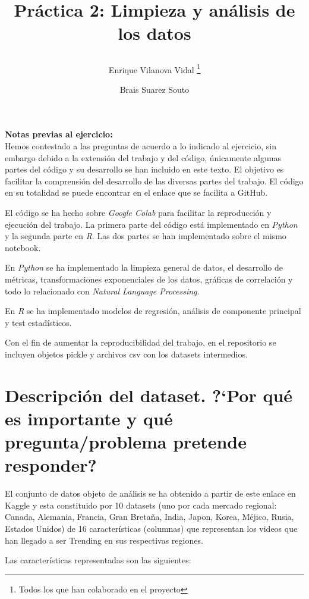 \documentclass[a4paper,12pt]{article}
\title{%

Pr\'actica 2: Limpieza y an\'alisis de los datos
	
	\author{%
	Enrique Vilanova Vidal%
		\thanks{Todos los que han colaborado en el proyecto}
	\and Brais Suarez Souto
	}
}
\begin{document}
\maketitle
\thispagestyle{empty}
\clearpage
{} 
\newpage

\textbf{Notas previas al ejercicio:} \\

Hemos contestado a las preguntas de acuerdo a lo indicado al ejercicio, sin embargo debido a la extensi\'on del trabajo y del c\'odigo, \'unicamente algunas partes del c\'odigo y su desarrollo  se han incluido en este texto. El objetivo es facilitar la comprensi\'on del desarrollo de las diversas partes del trabajo. El c\'odigo en su totalidad se puede encontrar en el enlace que se facilita a GitHub.

El c\'odigo se ha hecho sobre {\itshape Google Colab} para facilitar la reproducci\'on y ejecuci\'on del trabajo. La primera parte del c\'odigo est\'a implementado en {\itshape Python} y la segunda parte en {\itshape R}. Las dos partes se han implementado sobre el mismo notebook.

En {\itshape Python} se ha implementado la limpieza general de datos, el desarrollo de m\'etricas, transformaciones exponenciales de los datos, gr\'aficas de correlaci\'on y todo lo relacionado con {\itshape Natural Language Processing}.

En {\itshape R} se ha implementado modelos de regresi\'on, an\'alisis de componente principal y test estad\'isticos.

Con el fin de aumentar la reproducibilidad del  trabajo, en el repositorio se incluyen objetos pickle y archivos csv con los datasets intermedios.

\newpage
\section[item_descripcion]{Descripci\'on del dataset. ?`Por qu\'e es importante y qu\'e  pregunta/problema pretende responder?}

El conjunto de datos objeto de an\'alisis se ha obtenido a partir de este enlace en Kaggle y esta constituido por 10 datasets (uno por cada mercado regional: Canada, Alemania, Francia, Gran Breta\~na, India, Japon, Korea, M\'ejico, Rusia, Estados Unidos) de 16 caracter\'isticas (columnas) que representan los videos que han llegado a ser Trending en sus respectivas regiones.

Las caracter\'isticas representadas son las siguientes:
\end{document}
